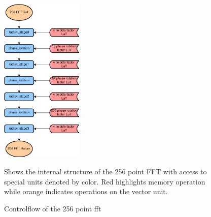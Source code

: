 \begin{figure}[h]
    \centering
    \includegraphics[width=0.35\textwidth]{images/256_func.png}
    \captionsetup{justification=centering}
    \caption{Controlflow of the 256 point \ac{fft}}
            Shows the internal structure of the 256 point FFT with access to special units denoted by color. Red highlights memory operation while orange indicates operations on the vector unit.
    \label{fig:256_kernel}
\end{figure}

